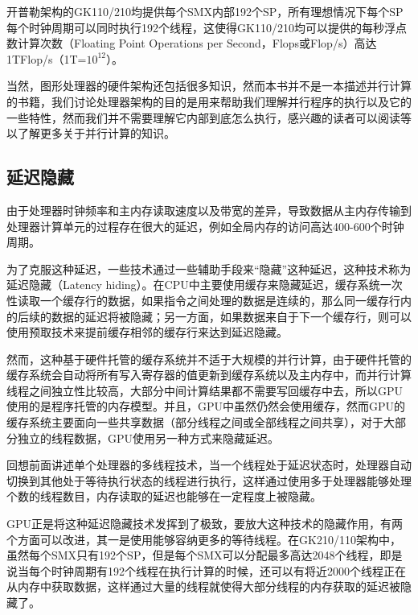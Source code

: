 开普勒架构的GK110/210均提供每个SMX内部192个SP，所有理想情况下每个SP每个时钟周期可以同时执行192个线程，这使得GK110/210均可以提供的每秒浮点数计算次数（Floating Point Operations per Second，Flops或Flop/s）高达1TFlop/s（1T=$10^{12}$）。

当然，图形处理器的硬件架构还包括很多知识，然而本书并不是一本描述并行计算的书籍，我们讨论处理器架构的目的是用来帮助我们理解并行程序的执行以及它的一些特性，然而我们并不需要理解它内部到底怎么执行，感兴趣的读者可以阅读\cite{a:NVIDIAsNextGenerationCUDATMComputeArchitecture:KeplerTMGK110/210,a:PascalArchitectureWhitepaper,a:CUDACPROGRAMMINGGUIDE}等以了解更多关于并行计算的知识。






\subsection{延迟隐藏}\label{sec-rp-latency}
由于处理器时钟频率和主内存读取速度以及带宽的差异，导致数据从主内存传输到处理器计算单元的过程存在很大的延迟，例如全局内存的访问高达400-600个时钟周期。

为了克服这种延迟，一些技术通过一些辅助手段来“隐藏”这种延迟，这种技术称为延迟隐藏（Latency hiding）。在CPU中主要使用缓存来隐藏延迟，缓存系统一次性读取一个缓存行的数据，如果指令之间处理的数据是连续的，那么同一缓存行内的后续的数据的延迟将被隐藏；另一方面，如果数据来自于下一个缓存行，则可以使用预取技术来提前缓存相邻的缓存行来达到延迟隐藏。

然而，这种基于硬件托管的缓存系统并不适于大规模的并行计算，由于硬件托管的缓存系统会自动将所有写入寄存器的值更新到缓存系统以及主内存中，而并行计算线程之间独立性比较高，大部分中间计算结果都不需要写回缓存中去，所以GPU使用的是程序托管的内存模型。并且，GPU中虽然仍然会使用缓存，然而GPU的缓存系统主要面向一些共享数据（部分线程之间或全部线程之间共享），对于大部分独立的线程数据，GPU使用另一种方式来隐藏延迟。

回想前面讲述单个处理器的多线程技术，当一个线程处于延迟状态时，处理器自动切换到其他处于等待执行状态的线程进行执行，这样通过使用多于处理器能够处理个数的线程数目，内存读取的延迟也能够在一定程度上被隐藏。

GPU正是将这种延迟隐藏技术发挥到了极致，要放大这种技术的隐藏作用，有两个方面可以改进，其一是使用能够容纳更多的等待线程。在GK210/110架构中，虽然每个SMX只有192个SP，但是每个SMX可以分配最多高达2048个线程，即是说当每个时钟周期有192个线程在执行计算的时候，还可以有将近2000个线程正在从内存中获取数据，这样通过大量的线程就使得大部分线程的内存获取的延迟被隐藏了。


